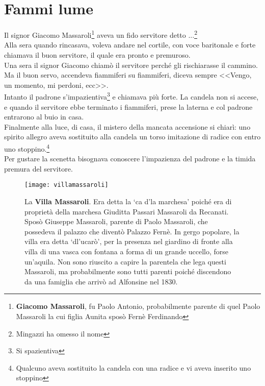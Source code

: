 
\chapter{Fammi lume}
Il signor Giacomo Massaroli\footnote{\textbf{Giacomo Massaroli}, fu Paolo Antonio, probabilmente parente di quel  Paolo Massaroli la cui figlia Aunita sposò Fernè Ferdinando} aveva un fido servitore detto ...\footnote{Mingazzi ha omesso il nome}\\
Alla sera quando rincasava, voleva andare nel cortile, con voce baritonale e forte chiamava il buon servitore, il quale era pronto e premuroso.\\
\indent Una sera il signor Giacomo chiamò il servitore perché gli rischiarasse il cammino. Ma il buon servo, accendeva fiammiferi su fiammiferi, diceva sempre <<Vengo, un momento, mi perdoni, ecc>>.\\
\indent Intanto il padrone s'impazientiva\footnote{Si spazientiva} e chiamava più forte. La candela non si accese, e quando il servitore ebbe terminato i fiammiferi, prese la laterna e col padrone entrarono al buio in casa.\\
\indent Finalmente alla luce, di casa, il mistero della mancata accensione si chiarì: uno spirito allegro aveva sostituito alla candela un torso imitazione di radice con entro uno stoppino.\footnote{Qualcuno aveva sostituito la candela con una radice e vi aveva inserito uno stoppino}\\
\indent Per gustare la scenetta bisognava conoscere l'impazienza del padrone e la timida premura del servitore.


\begin{figure}[htb]
    \centering
    \texttt{[image: villamassaroli]}
    \caption[Villa Massaroli]{
    	La \textbf{Villa Massaroli}. Era detta la `ca d'la marchesa' poiché era di proprietà della marchesa Giuditta Passari Massaroli da Recanati. Sposò Giuseppe Massaroli, parente di Paolo Massaroli, che possedeva il palazzo che diventò Palazzo Fernè. In gergo popolare, la villa era detta `dl'ucarò', per la presenza nel giardino di fronte alla villa di una vasca con fontana a forma di un grande uccello, forse un’aquila. Non sono riuscito a capire la parentela che lega questi Massaroli, ma probabilmente sono tutti parenti poiché discendono da una famiglia che arrivò ad Alfonsine nel 1830. 
    \label{fig:villamassaroli}
    }
\end{figure}